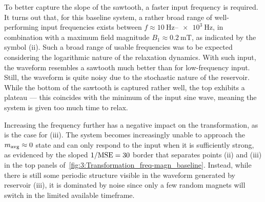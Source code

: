 \vspace{-1em}
\vspace{-1em}

To better capture the slope of the sawtooth, a faster input frequency is required.
It turns out that, for this baseline system, a rather broad range of well-performing input frequencies exists between $f \approx \SIrange{10}{e3}{\hertz}$, in combination with a maximum field magnitude $B_1 \approx \SI{0.2}{\milli\tesla}$, as indicated by the symbol \textsf{(ii)}.
Such a broad range of usable frequencies was to be expected considering the logarithmic nature of the relaxation dynamics.
With such input, the waveform resembles a sawtooth much better than for low-frequency input.
Still, the waveform is quite noisy due to the stochastic nature of the reservoir.
While the bottom of the sawtooth is captured rather well, the top exhibits a plateau --- this coincides with the minimum of the input sine wave, meaning the system is given too much time to relax. \par
Increasing the frequency further has a negative impact on the transformation, as is the case for \textsf{(iii)}.
The system becomes increasingly unable to approach the $m_\mathrm{avg} \approx 0$ state and can only respond to the input when it is sufficiently strong, as evidenced by the sloped $1/\mathrm{MSE}=30$ border that separates points \textsf{(ii)} and \textsf{(iii)} in the top panels of~\cref{fig:3:Transformation_freq-magn_baseline}.
Instead, while there is still some periodic structure visible in the waveform generated by reservoir \textsf{(iii)}, it is dominated by noise since only a few random magnets will switch in the limited available timeframe.

